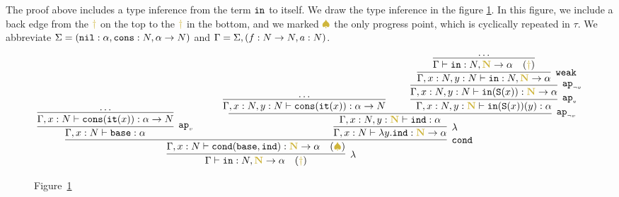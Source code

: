 The proof above includes a type inference from the term ${\tt in}$ to itself.
We draw the type inference in the figure \ref{figure-term-interval}. 
In this figure, we include a back edge from the 
$\bfColor{oldgold}{\dagger}$ on the top to the $\bfColor{oldgold}{\dagger}$ in the bottom,
and we marked $\bfColor{oldgold}{ \spadesuit}$ the only progress point, which is cyclically repeated
in $\tau$.
We abbreviate 
$\Sigma = ({\tt nil}:\alpha, {\tt cons}:{N},\alpha \rightarrow {N})$
and
$\Gamma = \Sigma,(f:{N} \rightarrow {N}, a:{N})$.

\begin{figure}
\label{figure-term-interval}


\begin{center}
  
\[
   {\infer[\lambda]  
     {\Gamma \vdash \interval:\N,\bfColor{oldgold}{\N}\rightarrow\alpha 
       \ \ \ (\bfColor{oldgold}{\dagger}) }
       {\infer[\cond]{\Gamma, x:\N 
	\vdash 
	\cond (\base,  \inductive )
	:\bfColor{oldgold}{\N}\rightarrow\alpha \ \ \ (\bfColor{oldgold}{ \spadesuit}) } 
       {\infer[\apvar]{\Gamma, x:\N 
	           \vdash 
	           \base:\alpha}
             {\infer[]{\Gamma, x:\N 
	           \vdash 
	           \cons(\iter(x)):\alpha \rightarrow\N}{\ldots}}
            {\ \ \ \ \ \ }  &
          \infer[\lambda]{\Gamma, x:\N 
	           \vdash 
	           \lambda y.\inductive : \bfColor{oldgold}{\N}\rightarrow\alpha}
             {\infer[\apnotvar]{\Gamma, x:\N, y:\bfColor{oldgold}{\N} \vdash
               \inductive : \alpha}
            {\infer[]
                     {\Gamma, x:\N, y:\N 
                          \vdash \cons(\iter(x)):\alpha\rightarrow\N}{\ldots}
               {\ \ \ \ \ \ }
                     {\infer[\apvar]{\Gamma, x:\N, y:\bfColor{oldgold}{\N} 
                          \vdash \interval(\Succ(x))(y):\alpha}
                         {\infer[\apnotvar]{\Gamma, x:\N, y:\N 
                          \vdash \interval(\Succ(x)):\bfColor{oldgold}{\N} \rightarrow\alpha}
                              {\infer[\weak]{\Gamma, x:\N, y:\N 
                          \vdash \interval:\N,\bfColor{oldgold}{\N} \rightarrow\alpha}
                                {\infer[]{\Gamma 
                          \vdash \interval:\N,\bfColor{oldgold}{\N} \rightarrow\alpha
                           \ \ \ (\bfColor{oldgold}{\dagger})}
              {\ldots}}}}}
             }
           }
         }
       }  
    }
\]

\mbox{Figure \ref{figure-term-interval}}
\end{center}

\end{figure}

